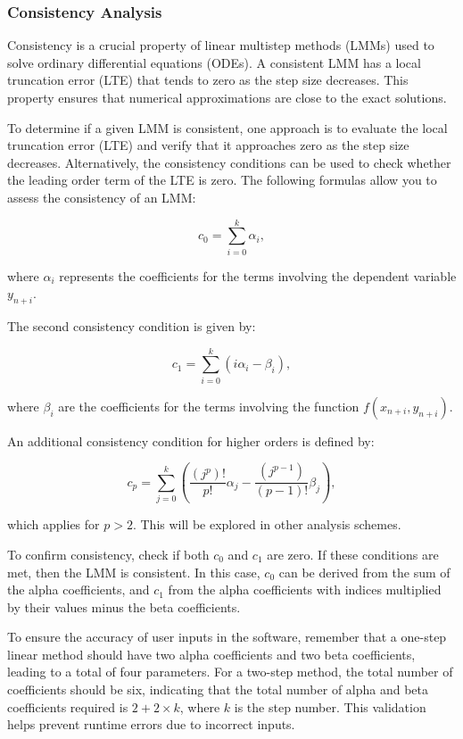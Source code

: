 \subsubsection{Consistency Analysis}

Consistency is a crucial property of linear multistep methods (LMMs) used to solve ordinary differential equations (ODEs). A consistent LMM has a local truncation error (LTE) that tends to zero as the step size decreases. This property ensures that numerical approximations are close to the exact solutions.

To determine if a given LMM is consistent, one approach is to evaluate the local truncation error (LTE) and verify that it approaches zero as the step size decreases. Alternatively, the consistency conditions can be used to check whether the leading order term of the LTE is zero. The following formulas allow you to assess the consistency of an LMM:

\begin{equation}
   c_0 = \sum_{i=0}^{k} \alpha_{i},
\end{equation}

where \(\alpha_{i}\) represents the coefficients for the terms involving the dependent variable \(y_{n+i}\).

The second consistency condition is given by:

\begin{equation}
   c_1 = \sum_{i=0}^{k} (i \alpha_{i} - \beta_{i}),
\end{equation}

where \(\beta_{i}\) are the coefficients for the terms involving the function \(f(x_{n+i}, y_{n+i})\).

An additional consistency condition for higher orders is defined by:

\begin{equation}
   c_p = \sum_{j=0}^{k} \left( \frac{(j^p)!}{p!} \alpha_j - \frac{(j^{p-1})}{(p-1)!} \beta_j \right),
\end{equation}

which applies for \(p > 2\). This will be explored in other analysis schemes.

To confirm consistency, check if both \(c_0\) and \(c_1\) are zero. If these conditions are met, then the LMM is consistent. In this case, \(c_0\) can be derived from the sum of the alpha coefficients, and \(c_1\) from the alpha coefficients with indices multiplied by their values minus the beta coefficients.

To ensure the accuracy of user inputs in the software, remember that a one-step linear method should have two alpha coefficients and two beta coefficients, leading to a total of four parameters. For a two-step method, the total number of coefficients should be six, indicating that the total number of alpha and beta coefficients required is \(2 + 2 \times k\), where \(k\) is the step number. This validation helps prevent runtime errors due to incorrect inputs.

